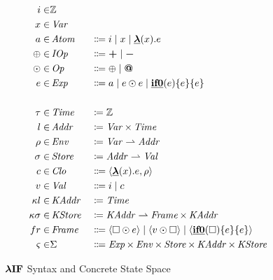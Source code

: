 \par

\begin{figure}

\small\begin{alignat*}{3}
i  \in  &  \mathbb{Z}  \\
x  \in  &  \operatorname{\mathit{Var}}  \\
a  \in  &  \operatorname{\mathit{Atom}}  &&  \Coloneqq  i  \;|\;  x  \;|\;   \underline{\operatorname{\mathtt{\boldsymbol{\mathbf{\lambda}}}}} (x).e \\
 \oplus   \in  &  \operatorname{\mathit{IOp}}  &&  \Coloneqq   \mathbin{\mathtt{\mathbf{\boldsymbol{+}}}}   \;|\;   \mathbin{\mathtt{\mathbf{\boldsymbol{-}}}}  \\
 \odot   \in  &  \operatorname{\mathit{Op}}  &&  \Coloneqq   \oplus   \;|\;   \mathbin{\mathtt{\mathbf{\boldsymbol{ \mathbin{\bm{@}} }}}}  \\
e  \in  &  \operatorname{\mathit{Exp}}  &&  \Coloneqq  a  \;|\;  e  \odot  e  \;|\;   \underline{\operatorname{\mathtt{\boldsymbol{\mathbf{if0}}}}} (e) \{ e \}  \{ e \}  \\
 \  \\
 \tau   \in  &  \operatorname{\mathit{Time}}  &&  \coloneqq   \mathbb{Z}  \\
l  \in  &  \operatorname{\mathit{Addr}}  &&  \coloneqq   \operatorname{\mathit{Var}}   \times   \operatorname{\mathit{Time}}  \\
 \rho   \in  &  \operatorname{\mathit{Env}}  &&  \coloneqq   \operatorname{\mathit{Var}}   \rightharpoonup   \operatorname{\mathit{Addr}}  \\
 \sigma   \in  &  \operatorname{\mathit{Store}}  &&  \coloneqq   \operatorname{\mathit{Addr}}   \rightharpoonup   \operatorname{\mathit{Val}}  \\
c  \in  &  \operatorname{\mathit{Clo}}  &&  \Coloneqq   \langle  \underline{\operatorname{\mathtt{\boldsymbol{\mathbf{\lambda}}}}} (x).e, \rho  \rangle  \\
v  \in  &  \operatorname{\mathit{Val}}  &&  \Coloneqq  i  \;|\;  c \\
 \kappa l  \in  &  \operatorname{\mathit{KAddr}}  &&  \coloneqq   \operatorname{\mathit{Time}}  \\
 \kappa  \sigma   \in  &  \operatorname{\mathit{KStore}}  &&  \coloneqq   \operatorname{\mathit{KAddr}}   \rightharpoonup   \operatorname{\mathit{Frame}}   \times   \operatorname{\mathit{KAddr}}  \\
fr  \in  &  \operatorname{\mathit{Frame}}  &&  \Coloneqq   \langle  \square   \odot  e \rangle   \;|\;   \langle v  \odot   \square  \rangle   \;|\;   \langle  \underline{\operatorname{\mathtt{\boldsymbol{\mathbf{if0}}}}} ( \square ) \{ e \}  \{ e \}  \rangle  \\
 \varsigma   \in  &  \Sigma  &&  \Coloneqq   \operatorname{\mathit{Exp}}   \times   \operatorname{\mathit{Env}}   \times   \operatorname{\mathit{Store}}   \times   \operatorname{\mathit{KAddr}}   \times   \operatorname{\mathit{KStore}} 
\end{alignat*}\normalsize

\caption{ $ \operatorname{\mathtt{\boldsymbol{\mathbf{\lambda{}IF}}}} $ Syntax and Concrete State Space }
\label{SS} \end{figure}

